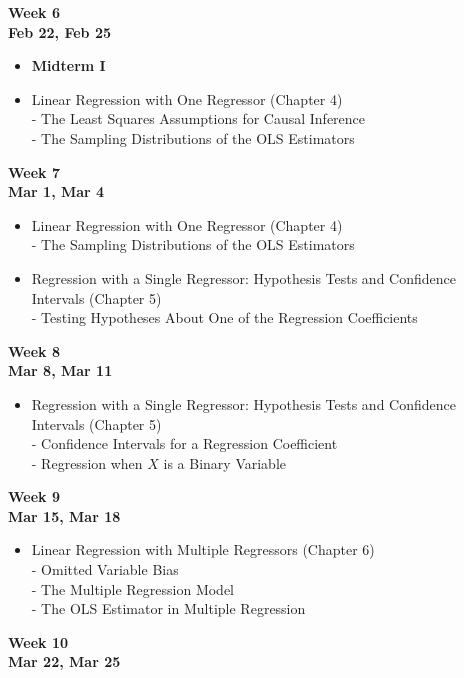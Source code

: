 \documentclass[
]{book}
\providecommand{\tightlist}{%
  \setlength{\itemsep}{0pt}\setlength{\parskip}{0pt}}
\begin{document}
\textbf{Week 6}\\
\textbf{Feb 22, Feb 25}

\begin{itemize}
\item
  \textbf{Midterm I}
\item
  Linear Regression with One Regressor (Chapter 4)\\
  - The Least Squares Assumptions for Causal Inference\\
  - The Sampling Distributions of the OLS Estimators
\end{itemize}

\textbf{Week 7}\\
\textbf{Mar 1, Mar 4}

\begin{itemize}
\item
  Linear Regression with One Regressor (Chapter 4)\\
  - The Sampling Distributions of the OLS Estimators
\item
  Regression with a Single Regressor: Hypothesis Tests and Confidence Intervals (Chapter 5)\\
  - Testing Hypotheses About One of the Regression Coefficients
\end{itemize}

\textbf{Week 8}\\
\textbf{Mar 8, Mar 11}

\begin{itemize}
\tightlist
\item
  Regression with a Single Regressor: Hypothesis Tests and Confidence Intervals (Chapter 5)\\
  - Confidence Intervals for a Regression Coefficient\\
  - Regression when \(X\) is a Binary Variable
\end{itemize}

\textbf{Week 9}\\
\textbf{Mar 15, Mar 18}

\begin{itemize}
\tightlist
\item
  Linear Regression with Multiple Regressors (Chapter 6)\\
  - Omitted Variable Bias\\
  - The Multiple Regression Model\\
  - The OLS Estimator in Multiple Regression
\end{itemize}

\textbf{Week 10}\\
\textbf{Mar 22, Mar 25}
\end{document}

